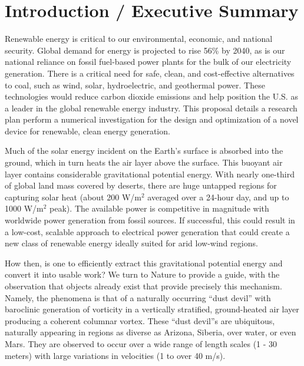 \section{Introduction / Executive Summary}

Renewable energy is critical to our environmental, economic, and
national security. Global demand for energy is projected to rise 56\% by
2040\cite{energy-outlook}, as is our national reliance on fossil
fuel-based power plants for the bulk of our electricity generation. 
There is a critical need for safe, clean, and
cost-effective alternatives to coal, such as wind, solar, hydroelectric,
and geothermal power. These technologies would reduce carbon dioxide
emissions and help position the U.S. as a leader in the global renewable
energy industry. 
%
This proposal details a research plan perform a numerical investigation
for the design and optimization of a novel device for renewable, clean
energy generation. 

Much of the solar energy incident on the Earth's surface is absorbed
into the ground, which in turn heats the air layer above the surface.
This buoyant air layer contains considerable gravitational potential
energy. 
With nearly one-third of global land mass covered by deserts, there are huge
untapped regions for capturing solar heat (about 200 W/$\text{m}^2$ averaged over
a 24-hour day, and up to 1000 W/$\text{m}^2$ peak)\cite{Hoyt197827}.
The available power is competitive in magnitude with worldwide power
generation from fossil sources. If successful, this could result in a
low-cost, scalable approach to electrical power generation that could
create a new class of renewable energy ideally suited for arid low-wind regions. 

How then, is one to efficiently extract this gravitational potential
energy and convert it into usable work? We turn to Nature to provide a 
guide, with the observation that objects already
exist that provide precisely this mechanism. Namely, the phenomena is
that of a naturally 
%
%
occurring ``dust devil'' with baroclinic generation of vorticity in a
vertically stratified, ground-heated air layer producing a coherent
columnar vortex. These ``dust devil''s are ubiquitous, naturally appearing in
regions as diverse as Arizona, Siberia, over water, or even
Mars\cite{Sinclair1969,ROG:ROG1635,JGRE:JGRE1660}.  
They are observed to occur over a wide range of length scales (1 - 30
meters) with large variations in velocities (1 to over 40
m/s)\cite{Sinclair1969}. 

